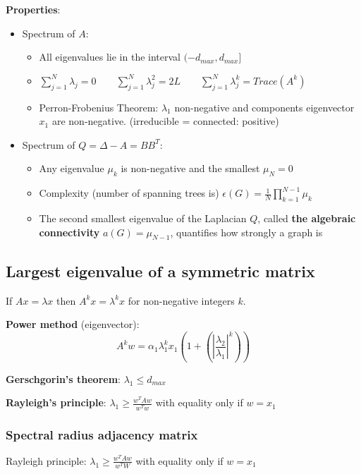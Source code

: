 \textbf{Properties}:
\begin{itemize}
  \item Spectrum of $A$:
  \begin{itemize}
    \item All eigenvalues lie in the interval $(-d_{max}, d_{max}]$
    \item $\sum_{j=1}^N \lambda_j = 0 \qquad \sum_{j=1}^N \lambda_j^2 = 2L \qquad
    \sum_{j=1}^N \lambda_j^k = Trace(A^k)$
    \item Perron-Frobenius Theorem: $\lambda_1$ non-negative and components eigenvector $x_1$ are
    non-negative. (irreducible = connected: positive)
  \end{itemize}
  \item Spectrum of $Q = \Delta - A = BB^T$:
  \begin{itemize}
    \item Any eigenvalue $\mu_k$ is non-negative and the smallest $\mu_N = 0$
    \item Complexity (number of spanning trees is) $\epsilon(G) = \frac{1}{N} \prod_{k=1}^{N-1} \mu_k$
    \item The second smallest eigenvalue of the Laplacian $Q$, called \textbf{the algebraic 
    connectivity} $a(G) = \mu_{N-1}$, quantifies how strongly a graph is 
  \end{itemize}
\end{itemize}

\subsection{Largest eigenvalue of a symmetric matrix} 

If $Ax = \lambda x$ then $A^k x = \lambda^k x$ for non-negative integers $k$.

\textbf{Power method} (eigenvector): 
$$
A^k w = \alpha_1 \lambda_1^k x_1 \left(1 + \left(\left|\frac{\lambda_2}{\lambda_1}
\right|^k\right)\right)
$$

\textbf{Gerschgorin's theorem}: $\lambda_1 \le d_{max}$

\textbf{Rayleigh's principle}: $\lambda_1 \ge \frac{w^T Aw}{w^Tw}$ with equality only if $w = x_1$

\subsubsection{Spectral radius adjacency matrix}
Rayleigh principle: $\lambda_1 \ge \frac{w^T Aw}{w^TW}$ with equality only if $w = x_1$

